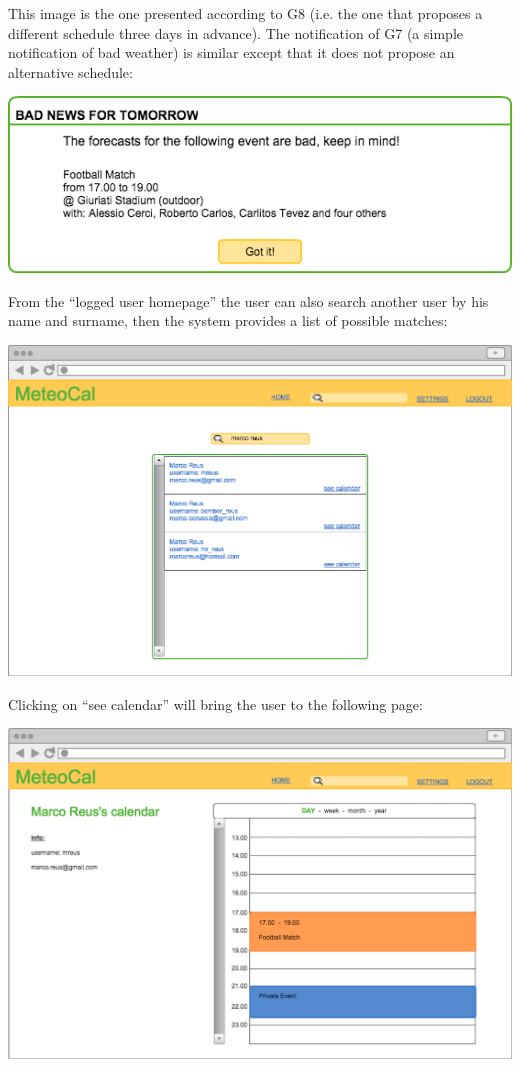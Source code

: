 \documentclass[10pt,a4paper,titlepage]{article}
\begin{document}
This image is the one presented according to G8 (i.e. the one that proposes a different schedule three days in advance). The notification of G7 (a simple notification of bad weather) is similar except that it does not propose an alternative schedule:

\vspace{3mm}\includegraphics[width={\linewidth}]{./UI_mockups/11-bad_weather_one_day}\vspace{3mm}

From the “logged user homepage” the user can also search another user by his name and surname, then the system provides a list of possible matches:

\vspace{3mm}\includegraphics[width={\linewidth}]{./UI_mockups/08-search.png}\vspace{3mm}

Clicking on “see calendar” will bring the user to the following page:

\vspace{3mm}\includegraphics[width={\linewidth}]{./UI_mockups/09-other_calendar.png}\vspace{3mm}
\end{document}
